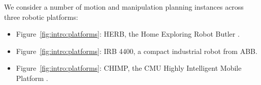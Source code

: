 We consider a number of motion and manipulation planning instances
across three robotic platforms:
\begin{itemize}
\item Figure~\ref{fig:intro:platforms}:
   HERB, the Home Exploring Robot Butler
   \citep{srinivasa2012herb20}.
\item Figure~\ref{fig:intro:platforms}:
   IRB 4400, a compact industrial robot from ABB.
\item Figure~\ref{fig:intro:platforms}:
   CHIMP, the CMU Highly Intelligent Mobile Platform
   \citep{stentz2014chimp}.
\end{itemize}

